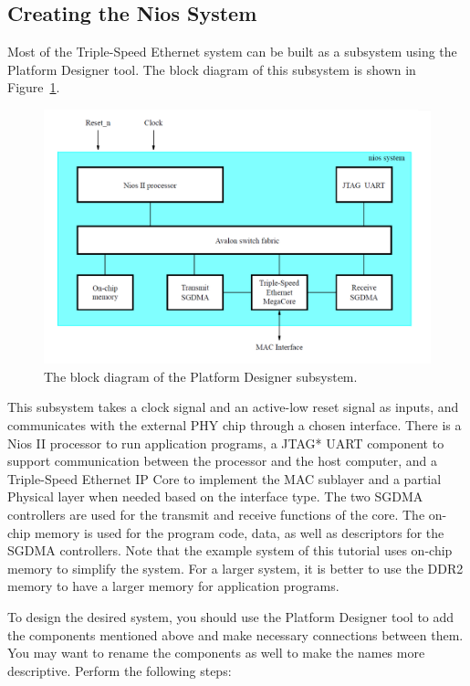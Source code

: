 \documentclass[11pt, twoside, pdftex]{article}
\begin{document}
\subsection{Creating the Nios\textsuperscript{\textregistered} System}
Most of the Triple-Speed Ethernet system can be built as a subsystem using the Platform Designer tool. The block diagram of this subsystem is shown in Figure~\ref{fig:subsystem_block_diagram}. 

\begin{figure}[H]
	\centering
	  \includegraphics[scale=0.5]{figures/subsystem_block_diagram.png}
	\caption{The block diagram of the Platform Designer subsystem.} 
	\label{fig:subsystem_block_diagram}
\end{figure}

This subsystem takes a clock signal and an active-low reset signal as inputs, and communicates with the external PHY chip through a chosen interface. There is a Nios II processor to run application programs, a JTAG* UART component to support communication between the processor and the host computer, and a Triple-Speed Ethernet IP Core to implement the MAC sublayer and a partial Physical layer when needed based on the interface type. The two SGDMA controllers are used for the transmit and receive functions of the core. The on-chip memory is used for the program code, data, as well as descriptors for the SGDMA controllers. Note that the example system of this tutorial uses on-chip memory to simplify the system. For a larger system, it is better to use the DDR2 memory to have a larger memory for application programs.

To design the desired system, you should use the Platform Designer tool to add the components mentioned above and make necessary connections between them. You may want to rename the components as well to make the names more descriptive. Perform the following steps:
\end{document}
